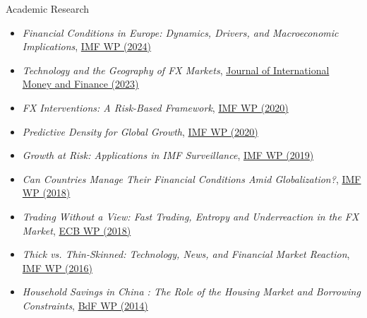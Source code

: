 \documentclass[usegeometry, 10pt, a4paper]{cv} %
\begin{document}
\begin{rubriquetableau}[0.95\textwidth]{Academic Research}\\
  \vspace{-0.8cm}
  \begin{itemize}
  \item \textit{Financial Conditions in Europe: Dynamics, Drivers, and Macroeconomic Implications}, \href{https://www.imf.org/en/Publications/WP/Issues/2023/09/29/Financial-Conditions-in-Europe-Dynamics-Drivers-and-Macroeconomic-Implications-539653}{IMF WP (2024)}
  \item \textit{Technology and the Geography of FX Markets}, \href{https://www.sciencedirect.com/science/article/abs/pii/S0261560623000037}{Journal of International Money and Finance (2023)}
  \item \textit{FX Interventions: A Risk-Based Framework}, \href{https://www.imf.org/en/Publications/WP/Issues/2021/02/12/Foreign-Exchange-Intervention-Rules-for-Central-Banks-A-Risk-based-Framework-50081}{IMF WP (2020)} 
  \item \textit{Predictive Density for Global Growth}, \href{https://www.imf.org/en/Publications/WP/Issues/2020/05/29/Predictive-Density-Aggregation-A-Model-for-Global-GDP-Growth-49441}{IMF WP (2020)} 
  \item \textit{Growth at Risk: Applications in IMF Surveillance}, \href{https://www.imf.org/en/Publications/WP/Issues/2019/02/21/Growth-at-Risk-Concept-and-Application-in-IMF-Country-Surveillance-46567}{IMF WP (2019)} 
  \item \textit{Can Countries Manage Their Financial Conditions Amid Globalization?}, \href{https://www.imf.org/en/Publications/WP/Issues/2018/01/24/Can-Countries-Manage-Their-Financial-Conditions-Amid-Globalization-45581}{IMF WP (2018)} 
  \item \textit{Trading Without a View: Fast Trading, Entropy and Underreaction in the FX  Market}, \href{https://cepr.org/voxeu/columns/fast-trading-and-virtue-entropy}{ECB WP (2018)}
  \item \textit{Thick vs. Thin-Skinned: Technology, News, and Financial Market Reaction}, \href{https://www.imf.org/en/Publications/WP/Issues/2017/04/07/Thick-vs-44810}{IMF WP (2016)}  
  \item \textit{Household Savings in China : The Role of the Housing Market and Borrowing Constraints}, \href{https://ideas.repec.org/p/pra/mprapa/44611.html}{BdF WP (2014)}  
  \end{itemize}
\end{rubriquetableau}
\end{document}
